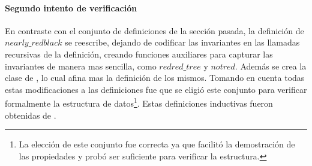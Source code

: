 \paragraph{Segundo intento de verificaci\'on}
En contraste con el conjunto de definiciones de la secci\'on pasada, la definici\'on de
\hyperref[inductive_isRedB]{$nearly\_redblack$} se reescribe, dejando de codificar las invariantes 
en las llamadas recursivas de la definición, creando funciones auxiliares para capturar las 
invariantes de manera mas sencilla, como \hyperref[inductive_isRedB]{$redred\_tree$} y $notred$. 
Además se crea la clase de {\arns}, lo cual afina mas la definici\'on de los mismos. Tomando en 
cuenta todas estas modificaciones a las definiciones fue que se eligió este conjunto para verificar 
formalmente la estructura de datos\footnote{La elecci\'on de este conjunto fue correcta ya que 
facilit\'o la demostraci\'on de las propiedades y prob\'o ser suficiente para verificar la estructura.}. 
Estas definiciones inductivas fueron obtenidas de \cite{MSetRBT}.
